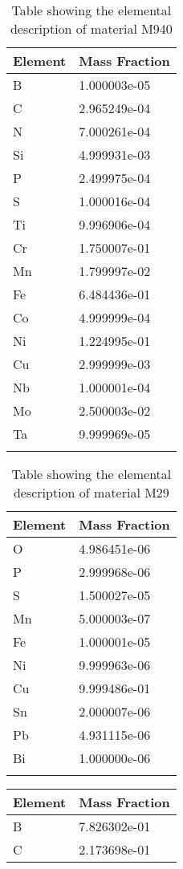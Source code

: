 \begin{centering}
\begin{longtable}[ht!]
{ p{} | p{} }
\hline
Element & Mass Fraction\\
\hline
B &  1.000003e-05\\
C &  2.965249e-04\\
N &  7.000261e-04\\
Si &  4.999931e-03\\
P &  2.499975e-04\\
S &  1.000016e-04\\
Ti &  9.996906e-04\\
Cr &  1.750007e-01\\
Mn &  1.799997e-02\\
Fe &  6.484436e-01\\
Co &  4.999999e-04\\
Ni &  1.224995e-01\\
Cu &  2.999999e-03\\
Nb &  1.000001e-04\\
Mo &  2.500003e-02\\
Ta &  9.999969e-05\\

\caption{Table showing the elemental description of material M940}
\label{table:material_EPPFW}
\end{longtable}
\clearpage

\begin{longtable}[ht!]
{ p{} | p{} }
\hline
Element & Mass Fraction\\
\hline
O &  4.986451e-06\\
P &  2.999968e-06\\
S &  1.500027e-05\\
Mn &  5.000003e-07\\
Fe &  1.000001e-05\\
Ni &  9.999963e-06\\
Cu &  9.999486e-01\\
Sn &  2.000007e-06\\
Pb &  4.931115e-06\\
Bi &  1.000000e-06\\

\caption{Table showing the elemental description of material M29}
\label{table:material_M29}
\end{longtable}
\clearpage


\begin{longtable}[ht!]
{ p{} | p{} }
\hline
Element & Mass Fraction\\
\hline
B &  7.826302e-01\\
C &  2.173698e-01\\


\end{longtable}
\end{centering}
